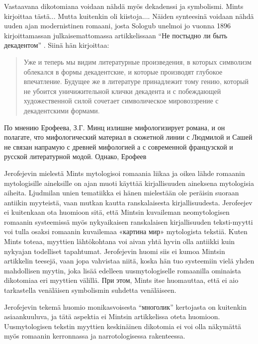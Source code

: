 \documentclass[12pt,a4paper]{article}
\begin{document}
Vastaavana dikotomiana voidaan nähdä myös dekadenssi ja symbolismi. Mints kirjoittaa tästä... Mutta kuitenkin oli kiistoja.... Näiden synteesinä voidaan nähdä uuden ajan modernistinen romaani, josta Sologub unelmoi jo vuonna 1896 kirjoittamassan julkaisemattomassa artikkelissaan \enquote{Не постыдно ли быть декадентом} \parencite{ref:sologub2007}. Siinä hän kirjoittaa:

\begin{quote}
Уже и теперь мы видим литературные произведения, в которых символизм облекался в формы декадентские, и которые производят глубокое впечатление. Будущее же в литературе принадлежит тому гению, который не убоится уничижительной клички декадента и с побеждающей художественной силой сочетает символическое мировоззрение с декадентскими формами.
\parencite[501.]{ref:sologub2007}
\end{quote}

По мнению Ерофеева, З.Г. Минц излишне мифологизирует романа, и он полагате, что мифологический материал в сюжетной линии с Людмилой и Сашей не связан напрамую с древней мифологией а с современной французской и русской литературной модой. Однако, Ерофеев 

Jerofejevin mielestä Mints mytologisoi romaania liikaa ja oikea lähde romaanin mytologisille aineksille on ajan muoti käyttää kirjallisuuden aineksena mytologisia aiheita. Ljudmilan unien tematiikka ei hänen mielestään ole peräisin suoraan antiikin myyteistä, vaan mutkan kautta ranskalaisesta kirjallisuudesta. \parencite[152.]{jerofeev1985} Jerofeejev ei kuitenkaan ota huomioon sitä, että Mintsin kuvaileman neomytologisen romaanin systeemissä myös nykyaikaisen ranskalaisen kirjallisuuden teksti-myytti voi tulla osaksi romaanin kuvailemaa «картина мир» mytologista tekstiä. Kuten Mints toteaa, myyttien lähtökohtana voi aivan yhtä hyvin olla antiikki kuin nykyajan todelliset tapahtumat. Jerofejevin huomi siis ei kumoa Mintsin artikkelin teesejä, vaan jopa vahvistaa niitä, koska hän tuo systeemiin vielä yhden mahdollisen myytin, joka lisää edelleen uusmytologiselle romaanilla ominaista dikotomiaa eri myyttien välillä. При этом, Mints itse huomauttaa, että ei aio tarkastella venäläisen symbolismin suhdetta venäläiseen. 



Jerofejevin tekemä huomio monikasvoisesta \enquote{многолик} kertojasta on kuitenkin asiaankuuluva, ja tätä aspektia ei Mintsin artikkelissa oteta huomioon. Uusmytologisen tekstin myyttien keskinäinen dikotomia ei voi olla näkymättä myös romaanin kerronnassa ja narrotologisessa rakenteessa. 
\end{document}
